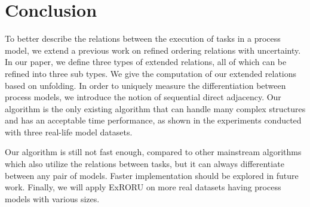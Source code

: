 \documentclass[dvips,...]{llncs}
\begin{document}
\section{Conclusion}\label{sec:conclusion}
To better describe the relations between the execution of tasks in a process model, we extend a previous work on refined ordering relations with uncertainty. In our paper, we define three types of extended relations, all of which can be refined into three sub types. We give the computation of our extended relations based on unfolding. In order to uniquely measure the differentiation between process models, we introduce the notion of sequential direct adjacency. Our algorithm is the only existing algorithm that can handle many complex structures and has an acceptable time performance, as shown in the experiments conducted with three real-life model datasets.

Our algorithm is still not fast enough, compared to other mainstream algorithms which also utilize the relations between tasks, but it can always differentiate between any pair of models. Faster implementation should be explored in future work. Finally, we will apply ExRORU on more real datasets having process models with various sizes.



\end{document}
